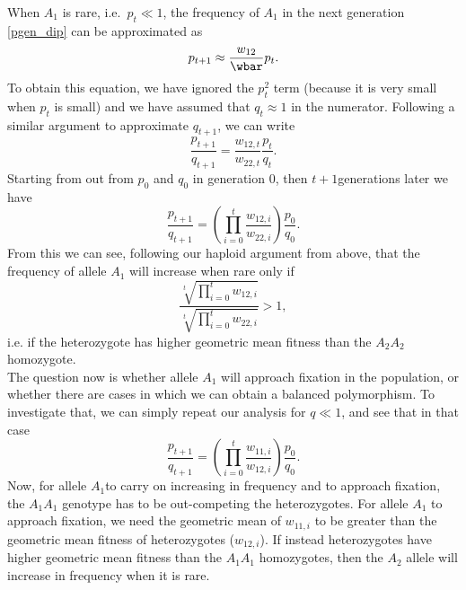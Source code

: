 When $A_1$ is rare, i.e.\ $p_t \ll 1$, the frequency of $A_1$ in the next
generation \eqref{pgen_dip} can be approximated as
\begin{equation}
p_{t+1} \approx \frac{w_{12}}{\wbar} p_t.
\end{equation}
To obtain this equation, we have ignored the $p_{t}^2$ term (because it is very small when $p_t$ is small) and we have assumed that $q_t \approx 1$ in the numerator.
Following a similar argument to approximate $q_{t+1}$, we can write
\begin{equation}
	\frac{p_{t+1}}{q_{t+1}} = \frac{w_{12,t}}{w_{22,t}}  \frac{p_{t}}{q_{t}}.
\end{equation}
Starting from out from $p_0$ and $q_0$ in generation $0$, then $t+1$generations later we have
\begin{equation}
	\frac{p_{t+1}}{q_{t+1}} = \left( \prod_{i=0}^{t} \frac{w_{12,i}}{w_{22,i}}  \right) \frac{p_{0}}{q_{0}}.
\end{equation}
From this we can see, following our haploid argument from above, that the frequency of allele $A_1$ will increase when rare only if
\begin{equation}
	\frac{\sqrt[t]{\prod_{i=0}^{t}w_{12,i}}}{\sqrt[t]{\prod_{i=0}^{t}w_{22,i}}}>1 \label{geometric_1wins},
\end{equation}
i.e. if the heterozygote has higher geometric mean fitness than the $A_2A_2$ homozygote.\\

The question now is whether allele $A_1$ will approach fixation in the population, or whether there are cases in which we can obtain a balanced polymorphism. To investigate that, we can simply repeat our analysis for $q \ll 1$, and see that in that case
\begin{equation}
	\frac{p_{t+1}}{q_{t+1}} = \left( \prod_{i=0}^{t} \frac{w_{11,i}}{w_{12,i}}  \right) \frac{p_{0}}{q_{0}}.
\end{equation}
Now, for allele $A_1$to carry on increasing in frequency and to approach fixation, the $A_1A_1$ genotype has to be out-competing the heterozygotes. For allele $A_1$ to approach fixation, we need the geometric mean of $w_{11,i}$ to be greater than the geometric mean fitness of heterozygotes ($w_{12,i}$).
If instead heterozygotes have higher geometric mean fitness than the $A_1A_1$ homozygotes, then the $A_2$ allele will increase in frequency when it is rare. 

